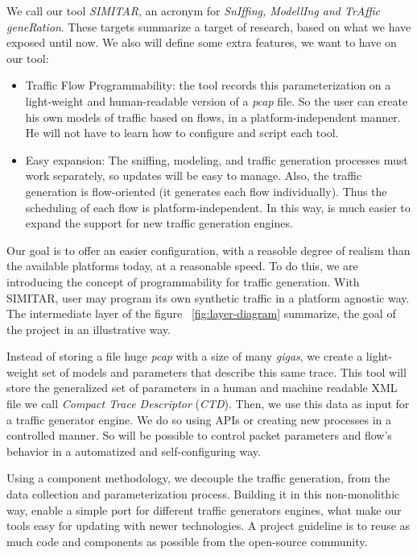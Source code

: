 We call our  tool \textit{SIMITAR}, an acronym for \textit{SnIffing, ModellIng and TrAffic geneRation}.  These targets summarize a target of research, based on what we have exposed until now. We also will define some extra features, we want to have on our tool:

\begin{itemize}


\item Traffic Flow Programmability: the tool records this parameterization on a light-weight and human-readable version of a \textit{pcap} file. So the user can create his own models of traffic based on flows, in a platform-independent manner. He will not have to learn how to configure and script each tool.


\item Easy expansion: The sniffing, modeling, and traffic generation processes must work separately, so updates will be easy to manage. Also, the traffic generation is flow-oriented (it generates each flow individually). Thus the scheduling of each flow is platform-independent. In this way, is much easier to expand the support for new traffic generation engines.

\end{itemize}


Our goal is to offer an easier configuration, with a reasoble degree of realism than the available platforms today, at a reasonable speed. To do this, we are introducing the concept of programmability for  traffic generation. With SIMITAR, user may program its own synthetic traffic in a platform agnostic way. The intermediate layer of the figure ~\ref{fig:layer-diagram} summarize, the goal of the project in an illustrative way.


Instead of storing a file huge \textit{pcap} with a size of many \textit{gigas}, we create a light-weight set of models and parameters that describe this same trace. This tool will store the generalized set of parameters in a human and machine readable XML file we call \textit{Compact Trace Descriptor} (\textit{CTD}). Then, we use this data as input for a traffic generator engine. We do so using APIs or creating new processes in a controlled manner. So will be possible to control packet parameters and flow's behavior in a automatized and self-configuring way.


Using a component methodology, we decouple the traffic generation, from the data collection and parameterization process. Building it in this non-monolithic way,  enable a simple port for different traffic generators engines, what make our tools easy for updating with newer technologies. A project guideline is to reuse as much code and components as possible from the open-source community.


